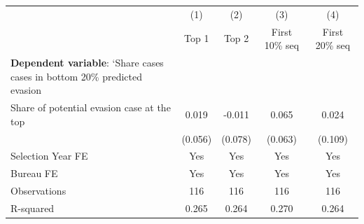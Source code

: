 {
\def\sym#1{\ifmmode^{#1}\else\(^{#1}\)\fi}
\begin{tabular}{l*{4}{c}}
\toprule
            &\multicolumn{1}{c}{(1)}&\multicolumn{1}{c}{(2)}&\multicolumn{1}{c}{(3)}&\multicolumn{1}{c}{(4)}\\
            &\multicolumn{1}{c}{Top 1}&\multicolumn{1}{c}{Top 2}&\multicolumn{1}{c}{First 10\% seq}&\multicolumn{1}{c}{First 20\% seq}\\
\midrule
\textbf{Dependent variable}: `Share cases cases in bottom 20\% predicted evasion&                     &                     &                     &                     \\
\addlinespace
Share of potential evasion case at the top&       0.019         &      -0.011         &       0.065         &       0.024         \\
            &     (0.056)         &     (0.078)         &     (0.063)         &     (0.109)         \\
\midrule
Selection Year FE&         Yes         &         Yes         &         Yes         &         Yes         \\
Bureau FE   &         Yes         &         Yes         &         Yes         &         Yes         \\
Observations&         116         &         116         &         116         &         116         \\
R-squared   &       0.265         &       0.264         &       0.270         &       0.264         \\
\bottomrule
\end{tabular}
}
